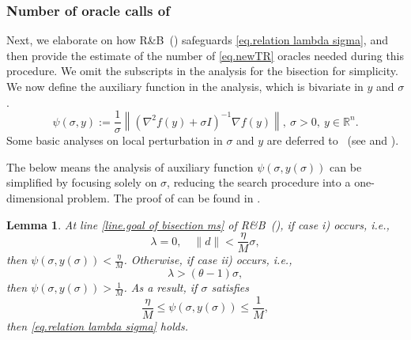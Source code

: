 \documentclass{article}
\newtheorem{lemma}[theorem]{Lemma}
\numberwithin{equation}{section}
\numberwithin{equation}{section}
\begin{document}
\subsubsection{Number of oracle calls of }\label{sec.validty of bisection}
Next, we elaborate on how R\&B~() safeguards \eqref{eq.relation lambda sigma}, and then provide the estimate of the number of \ref{eq.newTR} oracles needed during this procedure. We omit the subscripts in the analysis for the bisection for simplicity. We now define the auxiliary function in the analysis, which is bivariate in $y$ and $\sigma$.
\begin{equation}
    \label{eq.linesearch quantity}
    \psi(\sigma,y) := \frac{1}{\sigma}\left \| \left(\nabla^2 f(y)+\sigma I \right)^{-1}\nabla f(y)\right \|, \ \sigma>0, \ y\in\mathbb{R}^n.
\end{equation}
Some basic analyses on local perturbation in $\sigma$ and $y$ are deferred to ~(see  and ).

The below  means the analysis of auxiliary function $\psi(\sigma,y(\sigma))$ can be simplified by focusing solely on $\sigma$, reducing the search procedure into a one-dimensional problem. The proof of  can be found in .
\begin{lemma}
    \label{lem.reduce line search}
    At line \ref{line.goal of bisection ms} of \textnormal{R\&B}~(), if case i) occurs, i.e.,
    \begin{equation}
        \label{eq.bracket small lambda}
        \lambda = 0, \quad \|d\|<\frac{\eta}{M}\sigma,
    \end{equation}
    then $\psi(\sigma,y(\sigma))<\frac{\eta}{M}$.  Otherwise, if case ii) occurs, i.e.,
    \begin{equation}
        \label{eq.bracket big lambda}
        \lambda > (\theta-1)\sigma,
    \end{equation}
    then $\psi(\sigma,y(\sigma))>\frac{1}{M}$. As a result, if $\sigma$ satisfies
    \begin{equation}
        \label{eq.reduce line search interval}
        \frac{\eta}{M}\leq \psi(\sigma,y(\sigma)) \leq \frac{1}{M},
    \end{equation}
    then \eqref{eq.relation lambda sigma} holds.
\end{lemma}
\end{document}
